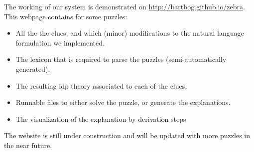 The working of our system is demonstrated on \url{http://bartbog.github.io/zebra}. This webpage contains for some puzzles: 
\begin{itemize}
 \item All the the clues, and which (minor) modifications to the natural language formulation we implemented. 
 \item The lexicon that is required to parse the puzzles (semi-automatically generated).
 \item The resulting idp theory associated to each of the clues.
 \item Runnable \idp files to either solve the puzzle, or generate the explanations. 
 \item The visualization of the explanation by derivation steps. 
\end{itemize}
The website is still under construction and will be updated with more puzzles in the near future. 
